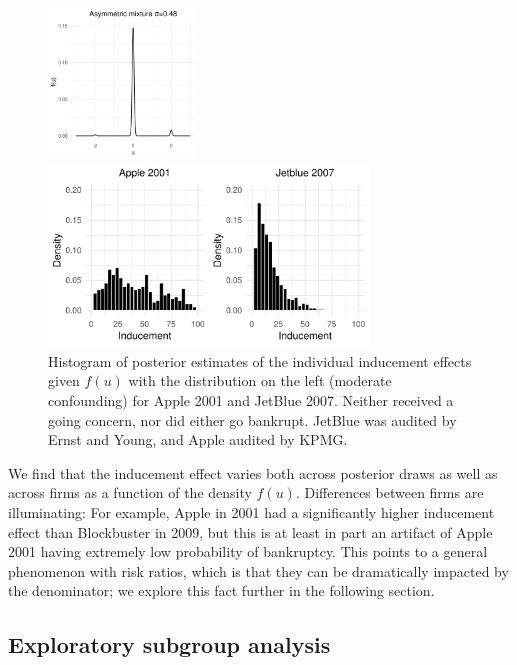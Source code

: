\documentclass[aoas,preprint, 11pt, dvipsnames, table, x11name]{imsart}
\theoremstyle{remark}
\begin{document}
	\begin{figure}[h]
		\centering	\begin{minipage}{.3\textwidth}
			\includegraphics[width=4cm]{rightbump2}
		\end{minipage}%
		\begin{minipage}{.5\textwidth}
			
			\includegraphics[width=8.5cm]{Apple_jetblue_right_RR}
		\end{minipage}
		\caption[Apple vs Jetblue]{Histogram of posterior estimates of the individual inducement effects given $f(u)$ with the distribution on the left (moderate confounding) for Apple 2001 and JetBlue 2007.  Neither received a going concern, nor did either go bankrupt.  JetBlue was audited by Ernst and Young, and Apple audited by KPMG.} 
		\label{individ_firm_plot}
	\end{figure}
	We find that the inducement effect varies both across posterior draws as well as across firms as a function of the density $f(u)$.  Differences between firms are illuminating: For example, Apple in 2001 had a significantly higher inducement effect than Blockbuster in 2009, but this is at least in part an artifact of Apple 2001 having extremely low probability of bankruptcy. This points to a general phenomenon with risk ratios, which is that they can be dramatically impacted by the denominator; we explore this fact further in the following section.
	
	\subsection{Exploratory subgroup analysis}\label{4.5} 
	
\end{document}
